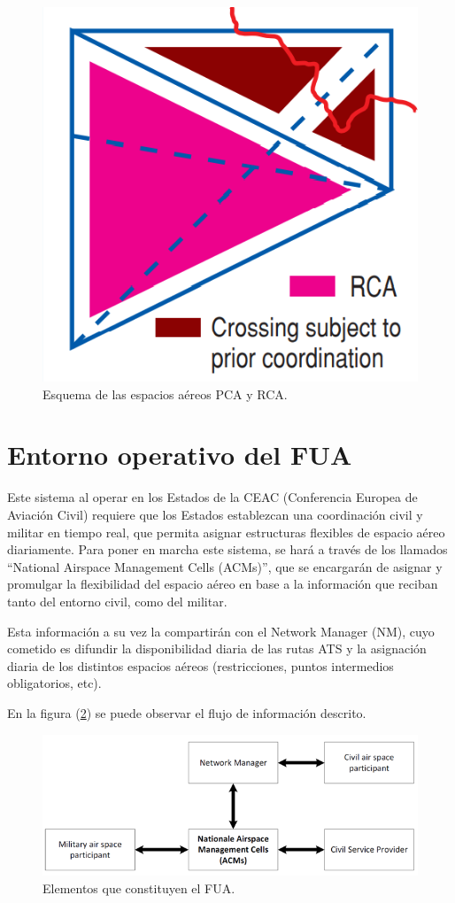 \begin{figure}[H]
    \centering
    \includegraphics[width=0.25\linewidth]{figuras/estructura_rca.png}
    \caption{Esquema de las espacios aéreos PCA y RCA.}
    \label{fig:estructura_rca}
\end{figure}

\section{Entorno operativo del FUA}

Este sistema al operar en los Estados de la CEAC (Conferencia Europea de Aviación Civil) requiere que los Estados establezcan una coordinación civil y militar en tiempo real, que permita asignar estructuras flexibles de espacio aéreo diariamente. Para poner en marcha este sistema, se hará a través de los llamados “National Airspace Management Cells (ACMs)”, que se encargarán de asignar y promulgar la flexibilidad del espacio aéreo en base a la información que reciban tanto del entorno civil, como del militar.

Esta información a su vez la compartirán con el Network Manager (NM), cuyo cometido es difundir la disponibilidad diaria de las rutas ATS y la asignación diaria de los distintos espacios aéreos (restricciones, puntos intermedios obligatorios, etc). 

En la figura (\ref{fig:elementos_fua}) se puede observar el flujo de información descrito.

\begin{figure}[H]
    \centering
    \includegraphics[width=1\linewidth]{figuras/elementos_fua.png}
    \caption{Elementos que constituyen el FUA.}
    \label{fig:elementos_fua}
\end{figure}

